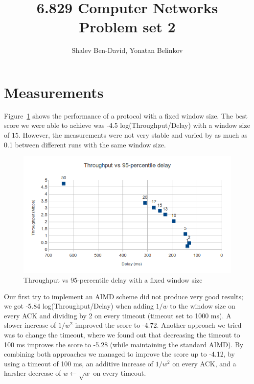 \documentclass[a4paper,10pt]{article}
\title{6.829 Computer Networks\\Problem set 2}
\author{Shalev Ben-David, Yonatan Belinkov}
\begin{document}
\maketitle

\section{Measurements}
Figure~\ref{fig:fixedWindow} shows the performance of a protocol with a fixed window size. 
The best score we were able to achieve was -4.5 log(Throughput/Delay) with a window 
size of 15. However, the measurements were not very stable and varied by as much 
as 0.1 between different runs with the same window size. 

\begin{figure}[h]
 \begin{center}
  \includegraphics[width=1\textwidth]{fixedWindow.png}
  \end{center}
 \caption{Throughput vs 95-percentile delay with a fixed window size}
 \label{fig:fixedWindow}
\end{figure}

Our first try to implement an AIMD scheme did not produce very good results; we got
-5.84 log(Throughput/Delay) when adding $ 1/w $ to the window size on
every ACK and dividing by 2 on every timeout (timeout set to 1000 ms). A slower 
increase of $ 1/w^2 $ improved the score to -4.72. Another approach we tried was to
change the timeout, where we found out that decreasing the timeout to 100 ms improves
the score to -5.28 (while maintaining the standard AIMD). By combining both approaches
we managed to improve the score up to -4.12, by using a timeout of 100 ms, an additive 
increase of $ 1/w^2 $ on every ACK, and a harsher decrease of $ w \leftarrow \sqrt{w} $ 
on every timeout.
\end{document}
